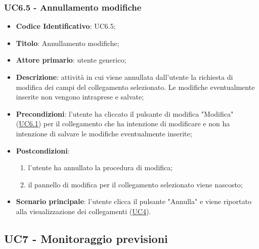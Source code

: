 	\subsubsection{UC6.5 - Annullamento modifiche}
		\begin{itemize}
			\item\textbf{Codice Identificativo}: UC6.5;
			\item\textbf{Titolo}: Annullamento modifiche;
			\item\textbf{Attore primario}: utente generico;
			\item\textbf{Descrizione}: attività in cui viene annullata dall'utente la richiesta di modifica dei campi del collegamento selezionato. Le modifiche eventualmente inserite non vengono intraprese e salvate;
			\item\textbf{Precondizioni}: l'utente ha cliccato il pulsante di modifica "Modifica" (\hyperref[par:UC6.1]{UC6.1}) per il collegamento che ha intenzione di modificare e non ha intenzione di salvare le modifiche eventualmente inserite;
			\item\textbf{Postcondizioni}: 	
			\begin{enumerate}
			\item l'utente ha annullato la procedura di modifica;
			\item il pannello di modifica per il collegamento selezionato viene nascosto;
			\end{enumerate}
			\item\textbf{Scenario principale}: l'utente clicca il pulsante "Annulla" e viene riportato alla visualizzazione dei collegamenti (\hyperref[par:UC4]{UC4}).
			\end{itemize}



	\label{par:UC7}
	\subsection{UC7 - Monitoraggio previsioni}


